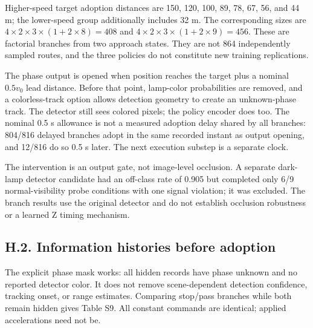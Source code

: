 \documentclass[letterpaper,journal,onecolumn]{IEEEtran}
\begin{document}
Higher-speed target adoption distances are 150, 120, 100, 89, 78, 67, 56, and 44 m; the lower-speed group additionally includes 32 m. The corresponding sizes are \(4\times2\times3\times(1+2\times8)=408\) and \(4\times2\times3\times(1+2\times9)=456\). These are factorial branches from two approach states. They are not 864 independently sampled routes, and the three policies do not constitute new training replications.

The phase output is opened when position reaches the target plus a nominal \(0.5v_0\) lead distance. Before that point, lamp-color probabilities are removed, and a colorless-track option allows detection geometry to create an unknown-phase track. The detector still sees colored pixels; the policy encoder does too. The nominal 0.5 s allowance is not a measured adoption delay shared by all branches: 804/816 delayed branches adopt in the same recorded instant as output opening, and 12/816 do so 0.5 s later. The next execution substep is a separate clock.

The intervention is an output gate, not image-level occlusion. A separate dark-lamp detector candidate had an off-class rate of 0.905 but completed only 6/9 normal-visibility probe conditions with one signal violation; it was excluded. The branch results use the original detector and do not establish occlusion robustness or a learned Z timing mechanism.

\subsection*{H.2. Information histories before adoption}

The explicit phase mask works: all hidden records have phase unknown and no reported detector color. It does not remove scene-dependent detection confidence, tracking onset, or range estimates. Comparing stop/pass branches while both remain hidden gives Table S9. All constant commands are identical; applied accelerations need not be.
\end{document}
